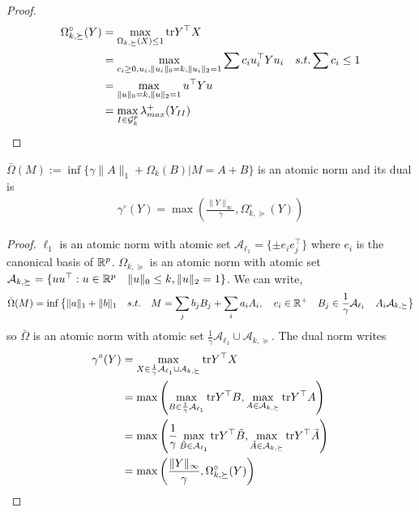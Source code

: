 \documentclass{article}
\begin{document}
\begin{proof}
\begin{align}
\Omega_{k,\succeq}^{\circ}(Y) 
&=\max_{\Omega_{k,\succeq}(X)\leq 1} {\rm tr}{Y^{\top}X}\\
&=\max_{c_i\geq 0, u_{i}, \|u_{i}\|_0=k, \|u_{i}\|_ 2=1 } \sum c_i u_{i}^{\top}Yu_{i} \quad s.t.  \sum c_i\leq 1\\
&=\max_{\|u\|_0=k, \|u\|_ 2=1 } u^{\top}Yu \\
&=\max_{I\in\mathcal{G}^p_k}\lambda^{+}_{max}(Y_{II})
\end{align}
\end{proof}

\begin{lemma} $\bar{\Omega}(M):=\inf\{\gamma\|A\|_{1}+\Omega_k(B)|M=A+B\}$ is an atomic norm and its dual is 
\begin{align*}
\gamma^{\circ}(Y)=\max\left(\frac{\|Y\|_{\infty}}{\gamma},\Omega_{k,\succeq}^{\circ}(Y)\right)
\end{align*}
\end{lemma}

\begin{proof}
$\ell_1$ is an atomic norm with atomic set $\mathcal{A}_{\ell_{1}}=\{\pm e_i e_j^{\top}\}$ where $e_i$ is the canonical basis of $\mathbb{R}^p$. $\Omega_{k,\succeq}$  is an atomic norm with atomic set $\mathcal{A}_{k,\succeq}=\{uu^{\top}  :  u\in\mathbb{R}^{p} \quad \|u\|_0 \leq k, \|u\|_2 = 1\}$. We can write,
$$
\bar{\Omega}(M)= \inf \big\{\|a\|_1+\|b\|_1 \quad s.t. \quad M=\sum_{j} b_j B_{j} + \sum_{i} a_i A_{i}, \quad c_i\in \mathbb{R}^{+}\quad B_j\in\frac{1}{\gamma}\mathcal{A}_{\ell_{1}} \quad A_i\mathcal{A}_{k,\succeq} \big\}
$$
so $\bar{\Omega}$ is an atomic norm with atomic set $\frac{1}{\gamma}\mathcal{A}_{\ell_{1}}\cup\mathcal{A}_{k,\succeq}$. The dual norm writes
\begin{align}
\gamma^{\circ}(Y)
& = \max_{X\in\frac{1}{\gamma}\mathcal{A}_{\ell_{1}}\cup\mathcal{A}_{k,\succeq}} {\rm tr}{Y^{\top}X}\\
& =\max\left(\max_{B\in\frac{1}{\gamma}\mathcal{A}_{\ell_{1}}}{\rm tr}{Y^{\top}B}, \max_{A\in\mathcal{A}_{k,\succeq}}{\rm tr}{Y^{\top}A}\right)\\
& =\max\left(\frac{1}{\gamma}\max_{\tilde{B}\in\mathcal{A}_{\ell_{1}}}{\rm tr}{Y^{\top}\tilde{B}}, \max_{\tilde{A}\in\mathcal{A}_{k,\succeq}}{\rm tr}{Y^{\top}\tilde{A}}\right)\\
& =\max\left(\frac{\|Y\|_{\infty}}{\gamma},\Omega_{k,\succeq}^{\circ}(Y)\right)
\end{align}
%
%
\end{proof}
\end{document}
